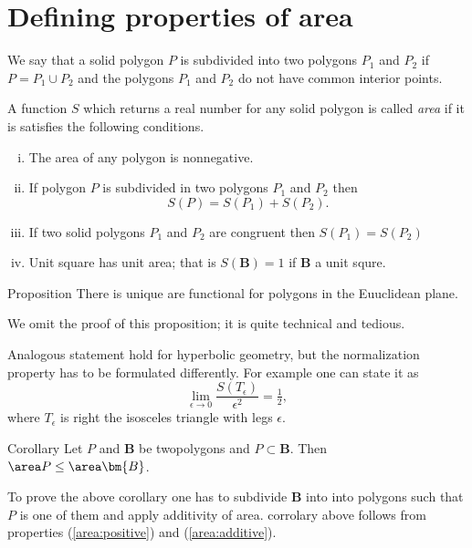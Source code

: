 {\section*{Defining properties of area}

We say that a solid polygon $P$ is subdivided 
into two polygons $P_1$ and $P_2$ 
if $P=P_1\cup P_2$ 
and the polygons $P_1$ and $P_2$ do not have common interior points. 

A function $S$ 
which returns a real number for any solid polygon is called \emph{area}
if it is satisfies the following conditions.

\begin{enumerate}[(i)]
\item\label{area:positive} The area of any polygon is nonnegative.
\item\label{area:additive} If polygon $P$ is subdivided in two polygons $P_1$ and $P_2$ then 
\[S(P)=S(P_1)+S(P_2).\]
\item\label{area:equal} If two solid polygons $P_1$ and $P_2$ are congruent then $S(P_1)=S(P_2)$
\item\label{area:unit} Unit square has unit area; that is $S(\bm{B})=1$ if $\bm{B}$ a unit squre.
\end{enumerate}


\begin{thm}{Proposition}
There is unique are functional for polygons in the Euuclidean plane. 
\end{thm}

We omit the proof of this proposition;
it is quite technical and tedious. 

Analogous statement hold for hyperbolic geometry, but the normalization property has to be formulated differently.
For example one can state it as 
\[\lim_{\epsilon\to0}\frac{S(T_\epsilon)}{\epsilon^2}=\tfrac12,\]
where 
$T_\epsilon$ is right the isosceles triangle with legs $\epsilon$.


\begin{thm}{Corollary}
Let $P$ and $\bm{B}$ be twopolygons and $P\subset \bm{B}$.
Then $\area P\le \area \bm{B}$.
\end{thm}

To prove the above corollary one has to subdivide $\bm{B}$ into into polygons
such that $P$ is one of them and apply additivity of area.
corrolary above 
follows from properties 
(\ref{area:positive}) and (\ref{area:additive}).






}
